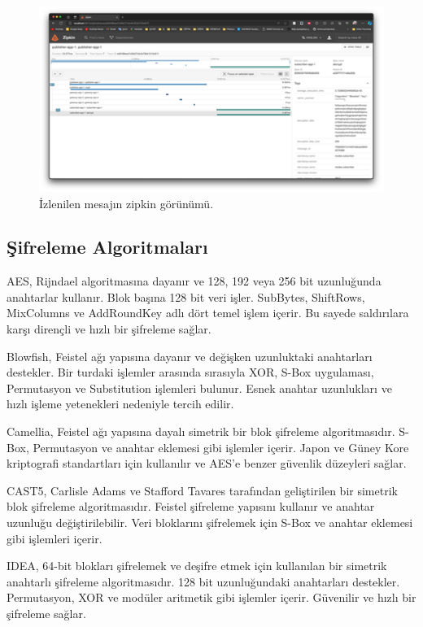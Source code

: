 \documentclass[conference, a4paper]{IEEEtran}
\begin{document}
\begin{figure}[H]
    \centering
    \shorthandoff{=}  
    \includegraphics[scale=1.00]{fig3.png}
    \shorthandon{=} 
    \caption{İzlenilen mesajın zipkin görünümü.}
    \label{sekil3}
\end{figure}

 \subsection{Şifreleme Algoritmaları}
    AES, Rijndael algoritmasına dayanır ve 128, 192 veya 256 bit uzunluğunda anahtarlar kullanır. Blok başına 128 bit veri işler. SubBytes, ShiftRows, MixColumns ve AddRoundKey adlı dört temel işlem içerir. Bu sayede saldırılara karşı dirençli ve hızlı bir şifreleme sağlar.
 
    Blowfish, Feistel ağı yapısına dayanır ve değişken uzunluktaki anahtarları destekler. Bir turdaki işlemler arasında sırasıyla XOR, S-Box uygulaması, Permutasyon ve Substitution işlemleri bulunur. Esnek anahtar uzunlukları ve hızlı işleme yetenekleri nedeniyle tercih edilir.
    
    Camellia, Feistel ağı yapısına dayalı simetrik bir blok şifreleme algoritmasıdır. S-Box, Permutasyon ve anahtar eklemesi gibi işlemler içerir. Japon ve Güney Kore kriptografi standartları için kullanılır ve AES'e benzer güvenlik düzeyleri sağlar.

    CAST5, Carlisle Adams ve Stafford Tavares tarafından geliştirilen bir simetrik blok şifreleme algoritmasıdır. Feistel şifreleme yapısını kullanır ve anahtar uzunluğu değiştirilebilir. Veri bloklarını şifrelemek için S-Box ve anahtar eklemesi gibi işlemleri içerir.

    IDEA, 64-bit blokları şifrelemek ve deşifre etmek için kullanılan bir simetrik anahtarlı şifreleme algoritmasıdır. 128 bit uzunluğundaki anahtarları destekler. Permutasyon, XOR ve modüler aritmetik gibi işlemler içerir. Güvenilir ve hızlı bir şifreleme sağlar.
\end{document}
